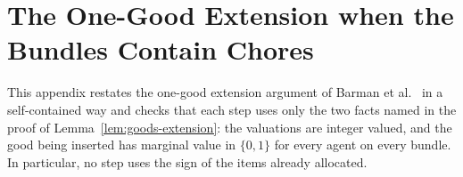\section{The One-Good Extension when the Bundles Contain Chores}
\label{app:goods-extension}

This appendix restates the one-good extension argument of Barman et
al.~\cite{BKNS22} in a self-contained way and checks that each step uses only
the two facts named in the proof of Lemma~\ref{lem:goods-extension}: the
valuations are integer valued, and the good being inserted has marginal value in
$\{0,1\}$ for every agent on every bundle. In particular, no step uses the sign
of the items already allocated.

